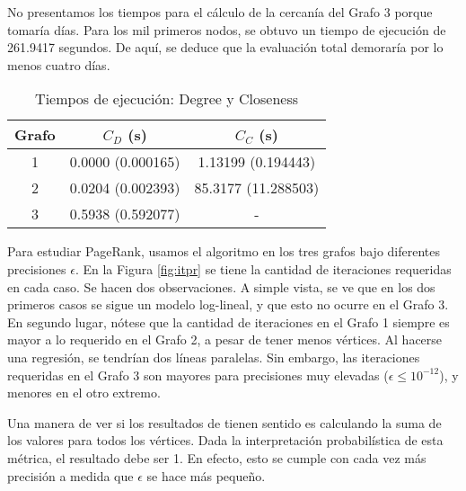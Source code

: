 \documentclass[journal]{IEEEtran}
\let\MYoriglatexcaption\caption
\renewcommand{\caption}[2][\relax]{\MYoriglatexcaption[#2]{#2}}
\begin{document}
No presentamos los tiempos para el cálculo de la cercanía del Grafo 3 porque tomaría días. Para los mil primeros nodos, se obtuvo un tiempo de ejecución de \num{261.9417} segundos. De aquí, se deduce que la evaluación total demoraría por lo menos cuatro días. 

\begin{table}
	\renewcommand{\arraystretch}{1.3}
	\caption{Tiempos de ejecución: Degree y Closeness}
	\label{tab:tejecucion}
	\centering
	\begin{tabular}{c|c|c}
		\hline
		Grafo & \(C_D\) (s) & \(C_C\) (s) \\
		\hline\hline
		1 & 0.0000 (0.000165) & 1.13199 (0.194443) \\
		2 & 0.0204 (0.002393) & 85.3177 (11.288503) \\
		3 & 0.5938 (0.592077) & - \\
		\hline
	\end{tabular}
\end{table}

Para estudiar PageRank, usamos el algoritmo en los tres grafos bajo diferentes precisiones \(\epsilon\). En la Figura \ref{fig:itpr} se tiene la cantidad de iteraciones requeridas en cada caso. Se hacen dos observaciones. A simple vista, se ve que en los dos primeros casos se sigue un modelo log-lineal, y que esto no ocurre en el Grafo 3. En segundo lugar, nótese que la cantidad de iteraciones en el Grafo 1 siempre es mayor a lo requerido en el Grafo 2, a pesar de tener menos vértices. Al hacerse una regresión, se tendrían dos líneas paralelas. Sin embargo, las iteraciones requeridas en el Grafo 3 son mayores para precisiones muy elevadas (\(\epsilon \leq 10^{-12} \)), y menores en el otro extremo.

Una manera de ver si los resultados de  tienen sentido es calculando la suma de los valores para todos los vértices. Dada la interpretación probabilística de esta métrica, el resultado debe ser 1. En efecto, esto se cumple con cada vez más precisión a medida que \(\epsilon\) se hace más pequeño.
\end{document}
